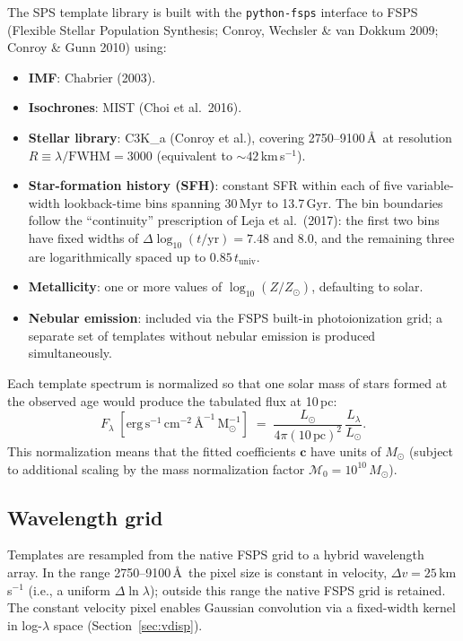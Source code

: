 \documentclass[12pt]{article}
\newcommand{\Msun}{M_{\odot}}
\newcommand{\Flam}{F_\lambda}
\newcommand{\cc}{\mathbf{c}}
\begin{document}
The SPS template library is built with the \texttt{python-fsps} interface
to FSPS (Flexible Stellar Population Synthesis; Conroy, Wechsler \&
van Dokkum 2009; Conroy \& Gunn 2010) using:
\begin{itemize}
  \item \textbf{IMF}: Chabrier (2003).
  \item \textbf{Isochrones}: MIST (Choi et al.\ 2016).
  \item \textbf{Stellar library}: C3K\_a (Conroy et al.), covering
    2750--9100\,\AA\ at resolution $R \equiv \lambda/\mathrm{FWHM} = 3000$
    (equivalent to ${\sim}42$\,km\,s$^{-1}$).
  \item \textbf{Star-formation history (SFH)}: constant SFR within each of
    five variable-width lookback-time bins spanning 30\,Myr to 13.7\,Gyr.
    The bin boundaries follow the ``continuity'' prescription of Leja et al.\
    (2017): the first two bins have fixed widths of $\Delta\log_{10}(t/\mathrm{yr})
    = 7.48$ and $8.0$, and the remaining three are logarithmically spaced up
    to $0.85\,t_{\mathrm{univ}}$.
  \item \textbf{Metallicity}: one or more values of $\log_{10}(Z/Z_\odot)$,
    defaulting to solar.
  \item \textbf{Nebular emission}: included via the FSPS built-in
    photoionization grid; a separate set of templates without nebular emission
    is produced simultaneously.
\end{itemize}

Each template spectrum is normalized so that one solar mass of stars formed
at the observed age would produce the tabulated flux at 10\,pc:
\begin{equation}
  \Flam \;[\mathrm{erg\,s^{-1}\,cm^{-2}\,\text{\AA}^{-1}\,\Msun^{-1}}]
  \;=\; \frac{L_\odot}{4\pi (10\,\mathrm{pc})^2}\,\frac{L_\lambda}{L_\odot}.
\end{equation}
This normalization means that the fitted coefficients $\cc$ have units of
$\Msun$ (subject to additional scaling by the mass normalization factor
$\mathcal{M}_0 = 10^{10}\,\Msun$).

\subsection{Wavelength grid}
\label{ssec:grid}

Templates are resampled from the native FSPS grid to a hybrid wavelength
array.  In the range 2750--9100\,\AA\ the pixel size is constant in velocity,
$\Delta v = 25$\,km\,s$^{-1}$ (i.e., a uniform $\Delta\ln\lambda$); outside
this range the native FSPS grid is retained.  The constant velocity pixel
enables Gaussian convolution via a fixed-width kernel in log-$\lambda$ space
(Section~\ref{sec:vdisp}).
\end{document}

